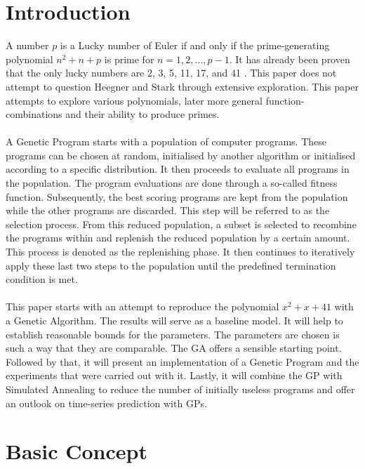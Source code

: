 \documentclass[11pt,a4paper]{article}
\begin{document}
\section*{Introduction}
A number $p$ is a Lucky number of Euler if and only if the prime-generating polynomial $n^2+n+p$ is prime for $n=1, 2, ..., p-1$. It has already been proven that the only lucky numbers are 2, 3, 5, 11, 17, and 41 \citep{Euler}. This paper does not attempt to question Heegner and Stark \citep{Euler} through extensive exploration. This paper attempts to explore various polynomials, later more general function-combinations and their ability to produce primes.
\\ \\
A Genetic Program starts with a population of computer programs. These programs can be chosen at random, initialised by another algorithm or initialised according to a specific distribution. It then proceeds to evaluate all programs in the population. The program evaluations are done through a so-called fitness function. Subsequently, the best scoring programs are kept from the population while the other programs are discarded. This step will be referred to as the selection process. From this reduced population, a subset is selected to recombine the programs within and replenish the reduced population by a certain amount. This process is denoted as the replenishing phase. It then continues to iteratively apply these last two steps to the population until the predefined termination condition is met.
\\ \\
This paper starts with an attempt to reproduce the polynomial $x^2+x+41$ with a Genetic Algorithm. The results will serve as a baseline model. It will help to establish reasonable bounds for the parameters. The parameters are chosen is such a way that they are comparable. The GA offers a sensible starting point. Followed by that, it will present an implementation of a Genetic Program and the experiments that were carried out with it. Lastly, it will combine the GP with Simulated Annealing to reduce the number of initially useless programs and offer an outlook on time-series prediction with GPs.
\section*{Basic Concept}
\end{document}
